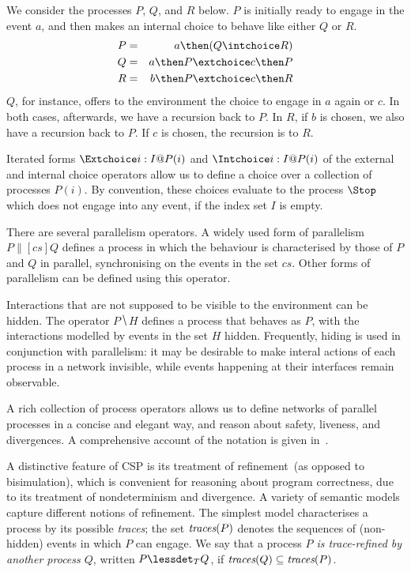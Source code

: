 \begin{example}\label{example:CSP}
  We consider the processes $P$, $Q$, and $R$ below. $P$ is initially
  ready to engage in the event $a$, and then makes an internal  choice to
  behave like either $Q$ or $R$.
  \begin{eqnarray*}
  P & = & a \then (Q\intchoice R)
  \\
  Q & = & a \then P \extchoice c \then P
  \\
  R & = & b \then P \extchoice c \then R
  \end{eqnarray*}
  $Q$, for instance, offers to the environment the choice to engage in $a$
  again or $c$. In both cases, afterwards, we have a recursion back to $P$.
  In $R$, if $b$ is chosen, we also have a recursion back to $P$. If $c$ is
  chosen, the recursion is to $R$.
  \xbox
\end{example}
%
Iterated forms $\Extchoice i: I @ P(i)$ and $\Intchoice i: I @ P(i)$ of the
external and internal choice operators allow us to define a choice over a
collection of processes $P(i)$. By convention, these choices evaluate to the process $\Stop$ 
which does not engage into any event, if the index set $I$ is empty.

There are several parallelism operators. A widely used form of parallelism $P
\parallel[cs] Q$ defines a process in which the behaviour is characterised by
those of $P$ and $Q$ in parallel, synchronising on the events in the set
$cs$. Other forms of parallelism can be defined using this operator.

Interactions that are not supposed to be visible to the environment can be
hidden. The operator $P \hide H$ defines a process that behaves as $P$, with the
interactions modelled by events in the set $H$ hidden. Frequently, hiding is used
in conjunction with parallelism: it may be desirable to make interal actions of each process in a network invisible, while events happening at their interfaces remain observable.


A rich collection of process operators allows us to define networks of
parallel processes in a concise and elegant way, and reason about safety,
liveness, and divergences.  A comprehensive account of the notation is given
in~\cite{Roscoe2010}.

A distinctive feature of CSP is its treatment of refinement~(as opposed to
bisimulation), which is convenient for reasoning about program correctness,
due to its treatment of nondeterminism and divergence.  A variety of semantic
models capture different notions of refinement. The simplest model
characterises a process by its possible \emph{traces}; the set $\text{\it traces}(P)$ denotes
 the sequences of (non-hidden) 
events in which
$P$ can engage.  We say that a process \emph{$P$ is trace-refined by another process
$Q$}, written $P \lessdet_T Q$, if $\text{\it traces}(Q)\subseteq \text{\it traces}(P)$. 


